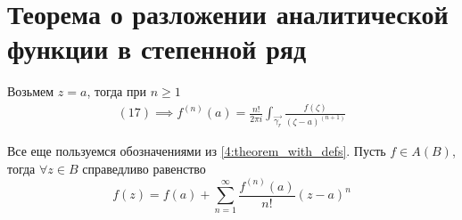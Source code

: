 \documentclass[main]{subfiles}
\begin{document}
\section{Теорема о разложении аналитической функции в степенной ряд}

Возьмем $z = a$, тогда при $n \ge 1$
\begin{gather*}
    (17) \implies f^{(n)} (a) = \frac{n!}{2 \pi i} \int_{\overrightarrow{\gamma_r}} \frac{f(\zeta)}{(\zeta - a)^{(n+1)}} \tag{18}
\end{gather*}
\begin{theorem}
    Все еще пользуемся обозначениями из \ref{4:theorem_with_defs}.
    Пусть $f \in A(B)$, тогда $\forall z \in B$ справедливо равенство
    \[f(z) = f(a) + \sum_{n=1}^{\infty} \frac{f^{(n)}  (a)}{n!}(z-a)^n \tag{19}\]
\end{theorem}
\end{document}
